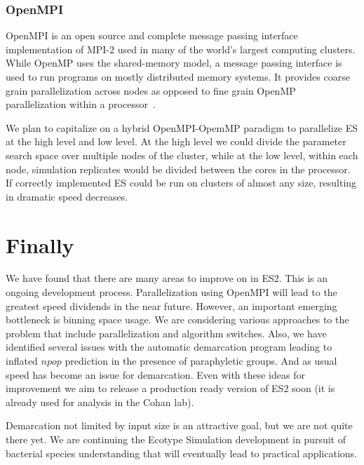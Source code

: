 \subsubsection*{OpenMPI}
OpenMPI is an open source and complete message passing interface implementation of MPI-2 used in many of the world's largest computing clusters.
While OpenMP uses the shared-memory model, a message passing interface is used to run programs on mostly distributed memory systems.
It provides coarse grain parallelization across nodes as opposed to fine grain OpenMP parallelization within a processor~\cite{gabriel04:_open_mpi}.

We plan to capitalize on a hybrid OpenMPI-OpemMP paradigm to parallelize ES at the high level and low level.
At the high level we could divide the parameter search space over multiple nodes of the cluster, while at the low level, within each node, simulation replicates would be divided between the cores in the processor.
If correctly implemented ES could be run on clusters of almost any size, resulting in dramatic speed decreases.



\section{Finally}
We have found that there are many areas to improve on in ES2.
This is an ongoing development process.
Parallelization using OpenMPI will lead to the greatest speed dividends in the near future.
However, an important emerging bottleneck is binning space usage.
We are considering various approaches to the problem that include parallelization and algorithm switches.
Also, we have identified several issues with the automatic demarcation program leading to inflated $npop$ prediction in the presence of paraphyletic groups.
And as usual speed has become an issue for demarcation.
Even with these ideas for improvement we aim to release a production ready version of ES2 soon (it is already used for analysis in the Cohan lab).

Demarcation not limited by input size is an attractive goal, but we are not quite there yet.
We are continuing the Ecotype Simulation development in pursuit of bacterial species understanding that will eventually lead to practical applications.